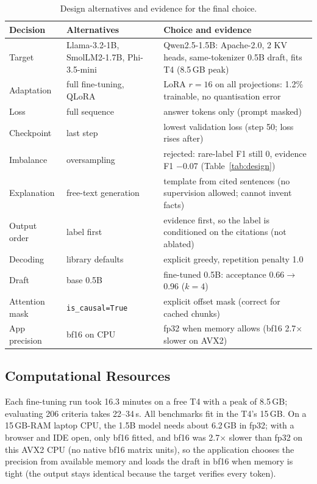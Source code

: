 \documentclass[conference]{IEEEtran}
\begin{document}
\begin{table}[t]
\centering
\caption{Design alternatives and evidence for the final choice.}
\label{tab:alternatives}
\footnotesize
\begin{tabular}{p{1.55cm}p{1.95cm}p{3.75cm}}
\toprule
Decision & Alternatives & Choice and evidence \\
\midrule
Target & Llama-3.2-1B, SmolLM2-1.7B, Phi-3.5-mini & Qwen2.5-1.5B: Apache-2.0, 2 KV heads, same-tokenizer 0.5B draft, fits T4 (8.5\,GB peak) \\
Adaptation & full fine-tuning, QLoRA & LoRA $r{=}16$ on all projections: 1.2\% trainable, no quantisation error \\
Loss & full sequence & answer tokens only (prompt masked) \\
Checkpoint & last step & lowest validation loss (step 50; loss rises after) \\
Imbalance & oversampling & rejected: rare-label F1 still 0, evidence F1 $-$0.07 (Table~\ref{tab:design}) \\
Explanation & free-text generation & template from cited sentences (no supervision allowed; cannot invent facts) \\
Output order & label first & evidence first, so the label is conditioned on the citations (not ablated) \\
Decoding & library defaults & explicit greedy, repetition penalty 1.0 \\
Draft & base 0.5B & fine-tuned 0.5B: acceptance 0.66$\rightarrow$0.96 ($k{=}4$) \\
Attention mask & \texttt{is\_causal=True} & explicit offset mask (correct for cached chunks) \\
App precision & bf16 on CPU & fp32 when memory allows (bf16 2.7$\times$ slower on AVX2) \\
\bottomrule
\end{tabular}
\end{table}

\subsection{Computational Resources}
Each fine-tuning run took 16.3 minutes on a free T4 with a peak of 8.5\,GB; evaluating 206 criteria takes 22--34\,s. All benchmarks fit in the T4's 15\,GB. On a 15\,GB-RAM laptop CPU, the 1.5B model needs about 6.2\,GB in fp32; with a browser and IDE open, only bf16 fitted, and bf16 was 2.7$\times$ slower than fp32 on this AVX2 CPU (no native bf16 matrix units), so the application chooses the precision from available memory and loads the draft in bf16 when memory is tight (the output stays identical because the target verifies every token).
\end{document}
